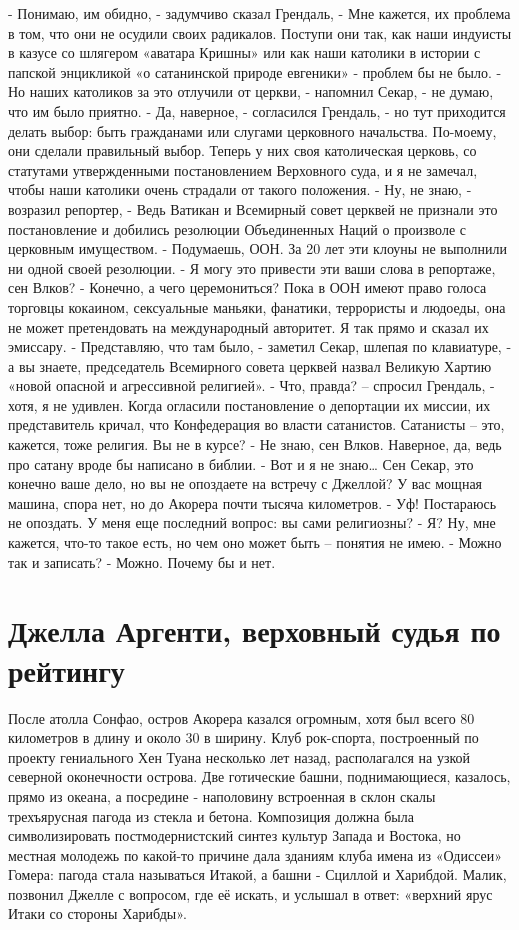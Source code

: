 \documentclass[10pt,final]{book}
\begin{document}
- Понимаю, им обидно, - задумчиво сказал Грендаль, - Мне кажется, их проблема в том, что они не осудили своих радикалов. Поступи они так, как наши индуисты в казусе со шлягером «аватара Кришны» или как наши католики в истории с папской энцикликой «о сатанинской природе евгеники» - проблем бы не было.
- Но наших католиков за это отлучили от церкви, - напомнил Секар, - не думаю, что им было приятно.
- Да, наверное, - согласился Грендаль, - но тут приходится делать выбор: быть гражданами или слугами церковного начальства. По-моему, они сделали правильный выбор. Теперь у них своя католическая церковь, со статутами утвержденными постановлением Верховного суда, и я не замечал, чтобы наши католики очень страдали от такого положения.
- Ну, не знаю, - возразил репортер, - Ведь Ватикан и Всемирный совет церквей не признали это постановление и добились резолюции Объединенных Наций о произволе с церковным имуществом.
- Подумаешь, ООН. За 20 лет эти клоуны не выполнили ни одной своей резолюции.
- Я могу это привести эти ваши слова в репортаже, сен Влков?
- Конечно, а чего церемониться? Пока в ООН имеют право голоса торговцы кокаином, сексуальные маньяки, фанатики, террористы и людоеды, она не может претендовать на международный авторитет. Я так прямо и сказал их эмиссару.
- Представляю, что там было, - заметил Секар, шлепая по клавиатуре, - а вы знаете, председатель Всемирного совета церквей назвал Великую Хартию «новой опасной и агрессивной религией».
- Что, правда? -- спросил Грендаль, - хотя, я не удивлен. Когда огласили постановление о депортации их миссии, их представитель кричал, что Конфедерация во власти сатанистов. Сатанисты -- это, кажется, тоже религия. Вы не в курсе?
- Не знаю, сен Влков. Наверное, да, ведь про сатану вроде бы написано в библии.
- Вот и я не знаю\ldots{} Сен Секар, это конечно ваше дело, но вы не опоздаете на встречу с Джеллой? У вас мощная машина, спора нет, но до Акорера почти тысяча километров.
- Уф! Постараюсь не опоздать. У меня еще последний вопрос: вы сами религиозны?
- Я? Ну, мне кажется, что-то такое есть, но чем оно может быть -- понятия не имею.
- Можно так и записать?
- Можно. Почему бы и нет.

\chapter{Джелла Аргенти, верховный судья по рейтингу}

После атолла Сонфао, остров Акорера казался огромным, хотя был всего 80 километров в длину и около 30 в ширину. Клуб рок-спорта, построенный по проекту гениального Хен Туана несколько лет назад, располагался на узкой северной оконечности острова. Две готические башни, поднимающиеся, казалось, прямо из океана, а посредине - наполовину встроенная в склон скалы трехъярусная пагода из стекла и бетона. Композиция должна была символизировать постмодернистский синтез культур Запада и Востока, но местная молодежь по какой-то причине дала зданиям клуба имена из «Одиссеи» Гомера: пагода стала называться Итакой, а башни - Сциллой и Харибдой. Малик, позвонил Джелле с вопросом, где её искать, и услышал в ответ: «верхний ярус Итаки со стороны Харибды».
\end{document}
